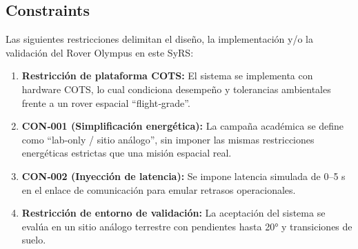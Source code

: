 \subsection{Constraints}\label{subsec:constraints}

Las siguientes restricciones delimitan el diseño, la implementación y/o la validación del Rover Olympus en este SyRS:

\begin{enumerate}
    \item \textbf{Restricción de plataforma COTS:} El sistema se implementa con hardware COTS, lo cual condiciona desempeño y tolerancias ambientales frente a un rover espacial ``flight‑grade''.
    \item \textbf{CON‑001 (Simplificación energética):} La campaña académica se define como ``lab‑only / sitio análogo'', sin imponer las mismas restricciones energéticas estrictas que una misión espacial real.
    \item \textbf{CON‑002 (Inyección de latencia):} Se impone latencia simulada de 0–5 s en el enlace de comunicación para emular retrasos operacionales.
    \item \textbf{Restricción de entorno de validación:} La aceptación del sistema se evalúa en un sitio análogo terrestre con pendientes hasta 20° y transiciones de suelo.
\end{enumerate}
